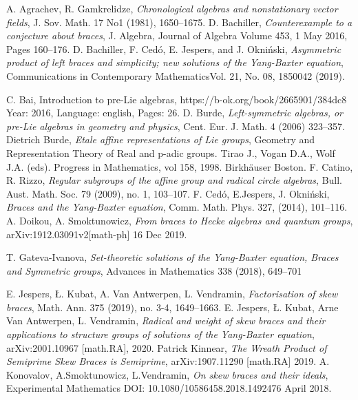 \documentclass[12pt]{article}
\begin{document}
\begin{thebibliography}{99}
 A. Agrachev, R. Gamkrelidze, {\em Chronological algebras and nonstationary vector fields},
J. Sov. Math. 17 No1 (1981), 1650–1675.
 D. Bachiller, {\em Counterexample to a conjecture about braces}, J. Algebra, Journal of Algebra
Volume 453, 1 May 2016, Pages 160--176.
  D. Bachiller, F. Ced{\'o}, E. Jespers, and J. Okni{\' n}ski, {\em Asymmetric product of left braces and simplicity; new solutions of the Yang-Baxter equation},  Communications in Contemporary MathematicsVol. 21, No. 08, 1850042 (2019). 

 C. Bai,  Introduction to pre-Lie algebras, https://b-ok.org/book/2665901/384dc8
  Year: 2016, Language: english, Pages: 26.
  D. Burde, {\em Left-symmetric algebras, or pre-Lie algebras in geometry and physics}, Cent. Eur. J. Math. 4 (2006) 323--357. 
 Dietrich Burde, {\em Etale affine representations of Lie groups}, Geometry and Representation Theory of Real and p-adic groups.  Tirao J., Vogan D.A., Wolf J.A. (eds). Progress in Mathematics, vol 158, 1998. Birkh{\" a}user Boston.
 F. Catino, R. Rizzo, {
\em  Regular subgroups of the affine group and radical circle algebras},
Bull. Aust. Math. Soc. 79 (2009), no. 1, 103--107.
 F. Ced{\' o}, E.Jespers, J. Okni{\' n}ski, {\em Braces and the Yang-Baxter equation}, Comm. Math. Phys. 327, 
 (2014), 101--116.
 A. Doikou, A. Smoktunowicz, {\em  From braces to Hecke algebras and quantum groups}, arXiv:1912.03091v2[math-ph] 16 Dec 2019.

 T. Gateva-Ivanova, {\em Set-theoretic solutions of the Yang-Baxter equation, Braces and Symmetric groups}, Advances in Mathematics 338 (2018), 649--701

  E. Jespers, {\L}. Kubat, A. Van Antwerpen, L. Vendramin, {\em Factorisation of skew braces}, Math. Ann. 375 (2019), no. 3-4, 1649--1663.
 E. Jespers, {\L}. Kubat, Arne Van Antwerpen,
L. Vendramin, {\em Radical and weight of skew braces and their applications to structure groups of solutions of the Yang-Baxter equation},
 arXiv:2001.10967 [math.RA], 2020.
 Patrick Kinnear, {\em The Wreath Product of Semiprime Skew Braces is Semiprime}, arXiv:1907.11290 [math.RA] 2019.
 A. Konovalov, A.Smoktunowicz, L.Vendramin, {\em On skew braces and their ideals}, Experimental Mathematics 
DOI: 10.1080/10586458.2018.1492476 April 2018.
 

\end{thebibliography}
\end{document}
